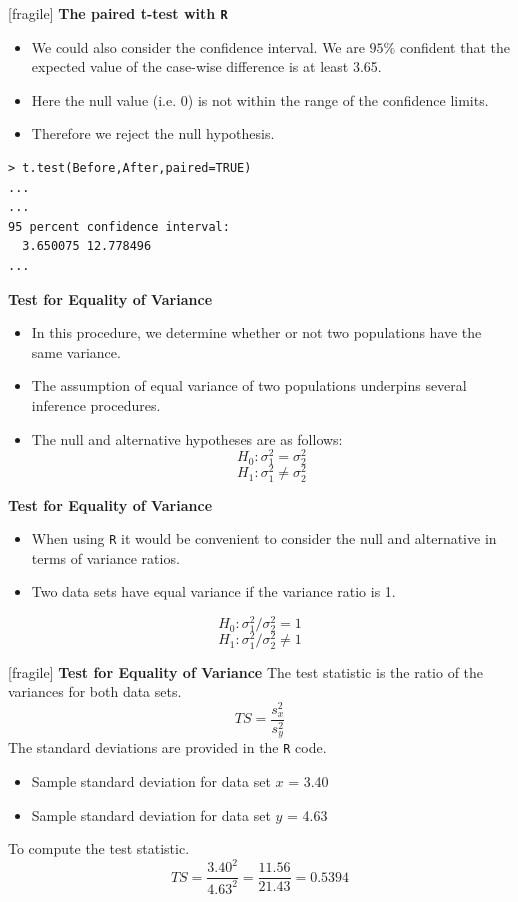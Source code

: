 \documentclass[a4]{beamer}
\begin{document}
[fragile]
\noindent \textbf{The paired t-test with \texttt{R}}
\begin{itemize}
\item We could also consider the confidence interval. We are $95\%$ confident that the expected value of the case-wise difference is at least 3.65.
\item Here the null value (i.e. 0) is not within the range of the confidence limits.
\item Therefore we reject the null hypothesis.
\end{itemize}
\begin{verbatim}
> t.test(Before,After,paired=TRUE)
...
...
95 percent confidence interval:
  3.650075 12.778496
...
\end{verbatim}







\noindent \textbf{Test for Equality of Variance}
\begin{itemize}
\item In this procedure, we determine whether or not two populations have the same variance.
\item The assumption of equal variance of two populations underpins several inference procedures. 
\ %
\item The null and alternative hypotheses are as follows:
\[ H_0: \sigma^2_1 = \sigma^2_2 \]
\[ H_1: \sigma^2_1 \neq \sigma^2_2 \]
\end{itemize}



\noindent \textbf{Test for Equality of Variance}
\begin{itemize}
\item When using \texttt{R} it would be convenient to consider the null and alternative in terms of variance ratios.
\item Two data sets have equal variance if the variance ratio is 1.
\end{itemize}

\[ H_0: \sigma^2_1 / \sigma^2_2 = 1 \]
\[ H_1: \sigma^2_1 / \sigma^2_2 \neq 1 \]

[fragile]
\noindent \textbf{Test for Equality of Variance}
The test statistic is the ratio of the variances for both data sets.
\[ TS = \frac{s^2_x}{s^2_y} \]
The standard deviations are provided in the \texttt{R} code. \begin{itemize}
\item Sample standard deviation for data set $x$ = 3.40
\item Sample standard deviation for data set $y$ = 4.63
\end{itemize}
To compute the test statistic.
\[ TS = \frac{3.40^2}{4.63^2} = \frac{11.56}{21.43} = 0.5394 \]
\end{document}
